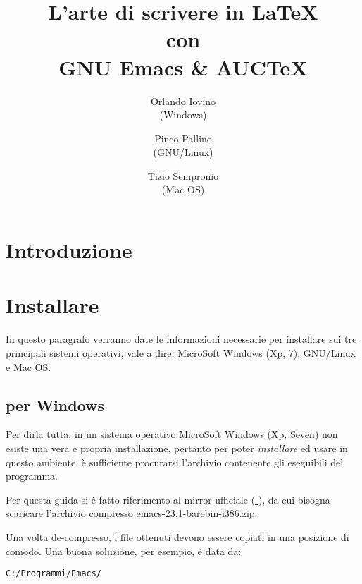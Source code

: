 \documentclass[10pt,a4paper]{article}
\title{L'arte di scrivere in \LaTeX{}\\
  con\\
  GNU Emacs \& AUC\TeX{}}
\author{Orlando Iovino\\(Windows)
  \and Pinco Pallino\\(GNU/Linux)
  \and Tizio Sempronio\\(Mac OS)}
\begin{document}
\maketitle
\begin{abstract}\sffamily
\end{abstract}

\begin{multicols}{2}
  \tableofcontents
\end{multicols}

\section{Introduzione}
\label{sec:intro}


\section{Installare \emacs}
\label{sec:install}

In questo paragrafo verranno date le informazioni necessarie per installare
\emacs{} sui tre principali sistemi operativi, vale a dire: 
\textsf{MicroSoft Windows (Xp, 7)},
\textsf{GNU/Linux} e %
\textsf{Mac OS}.  %


\subsection*{\emacs{} per Windows}
\label{sec:installwin}
Per dirla tutta, in un sistema operativo MicroSoft Windows (Xp, Seven)
non esiste una vera e propria installazione, pertanto per poter
\emph{installare} ed usare \emacs{} in questo ambiente,
è sufficiente procurarsi l'archivio contenente gli eseguibili del programma.

Per questa guida si è fatto riferimento al mirror ufficiale
(\href{http://ftp.gnu.org/pub/gnu/emacs/windows/}{\mano{} \emacs}),
da cui bisogna scaricare l'archivio compresso
\href{http://ftp.gnu.org/pub/gnu/emacs/windows/emacs-23.1-barebin-i386.zip}
{\textsf{emacs-23.1-barebin-i386.zip}}.

Una volta de-compresso, i file ottenuti devono essere copiati in una
posizione di comodo. Una buona soluzione, per esempio, è data da:

\begin{verbatim}
C:/Programmi/Emacs/
\end{verbatim}
\end{document}
